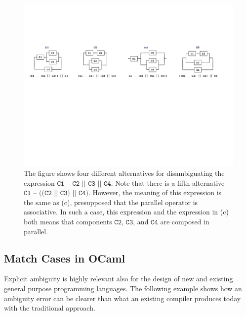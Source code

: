 \documentclass[runningheads]{llncs}
\begin{document}
\begin{figure}[!t]
\center
\includegraphics[width=1.0\textwidth]{circuits.pdf}
\caption{The figure shows four different alternatives for disambiguating the expression $\texttt{C1 -- C2 || C3 || C4}$. Note that there is a fifth alternative $\texttt{C1 -- ((C2 || C3) || C4)}$. However, the meaning of this expression is the same as (c), presupposed that the parallel operator is associative. In such a case, this expression and the expression in (c) both means that components $\texttt{C2}$, $\texttt{C3}$, and $\texttt{C4}$ are composed in parallel. }
\label{fig:circuits}
\end{figure}



\subsection{Match Cases in OCaml}

Explicit ambiguity is highly relevant also for the design of new and existing general purpose programming languages. The following example shows how an ambiguity error can be clearer than what an existing compiler produces today with the traditional approach.


\end{document}
